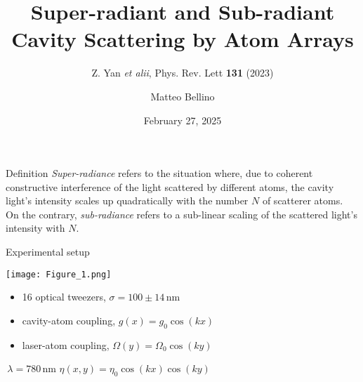 \documentclass{beamer}
\author{Matteo Bellino}
\title{Super-radiant and Sub-radiant Cavity Scattering by Atom Arrays}
\subtitle{Z. Yan \textit{et alii}, Phys. Rev. Lett \textbf{131} (2023)}
\date{February 27, 2025}
\begin{document}
\frame{\maketitle}
\begin{frame}{Definition}
	\alert{\textit{Super-radiance}} refers to the situation where, due to coherent constructive interference of the light scattered by different atoms, the cavity light's intensity scales up quadratically with the number $N$ of scatterer atoms.\newline
	~\newline
	On the contrary, \alert{\textit{sub-radiance}} refers to a sub-linear scaling of the scattered light's intensity with $N$.
\end{frame}

\begin{frame}{Experimental setup}
	\begin{minipage}{\textwidth}
		\centering
		\texttt{[image: Figure\_1.png]}
		\hspace{3em}
	\end{minipage}\newline
	\vspace{2em}
	\begin{minipage}{\textwidth}
		\begin{minipage}{0.57\textwidth}
			\begin{itemize}
				\item {\small 16 optical tweezers, $\sigma = 100\pm14\,$nm\pause}
				\item {\small cavity-atom coupling, $g(x)=g_0\cos(kx)$}\pause
				\item {\small laser-atom coupling, $\Omega(y)=\Omega_0\cos(ky)$}
			\end{itemize}
		\end{minipage}
		\begin{minipage}{0.42\textwidth}
			\centering
			$\,\lambda=780\,$nm\newline
			\alert{$\eta(x,y)=\eta_0\cos(kx)\cos(ky)$}
		\end{minipage}
	\end{minipage}
\end{frame}
\end{document}
